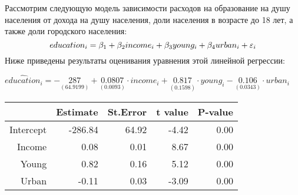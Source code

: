 \documentclass[pdftex,11pt,openany]{book}\usepackage[]{graphicx}\usepackage[]{color}
\begin{document}
\begin{problem}
 Рассмотрим следующую модель зависимости расходов на образование на душу населения от дохода на душу населения, доли населения в возрасте до 18 лет, а также доли городского населения: 
\[
education_i = \beta_1 + \beta_2 income_i + \beta_3 young_i + \beta_4 urban_i + \varepsilon_i
\]
Ниже приведены результаты оценивания уравнения этой линейной регрессии:
\begin{center}
\ensuremath{\widehat{education}_i=-\underset{(64.9199)}{287}+\underset{( 0.0093)}{0.0807}\cdot income_i+\underset{( 0.1598)}{0.817}\cdot young_i-\underset{( 0.0343)}{0.106}\cdot urban_i}%
\begin{table}[ht]
\centering
\begin{tabular}{rrrrr}
  \hline
 & Estimate & St.Error & t value & P-value \\ 
  \hline
Intercept & -286.84 & 64.92 & -4.42 & 0.00 \\ 
  Income & 0.08 & 0.01 & 8.67 & 0.00 \\ 
  Young & 0.82 & 0.16 & 5.12 & 0.00 \\ 
  Urban & -0.11 & 0.03 & -3.09 & 0.00 \\ 
   \hline
\end{tabular}
\end{table}

\end{center}


\end{problem}
\end{document}
